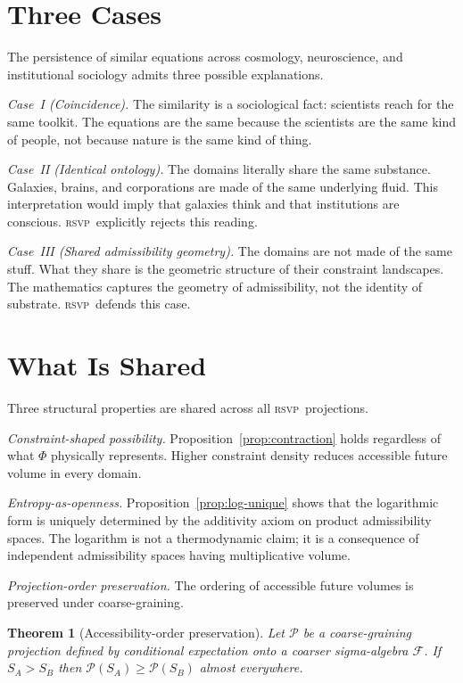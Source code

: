 \documentclass[12pt, oneside]{book}
\theoremstyle{plain}
\newtheorem{theorem}{Theorem}[chapter]
\theoremstyle{definition}
\newcommand{\RSVP}{\textsc{rsvp}}
\begin{document}
\section{Three Cases}
\label{sec:three-cases}

The persistence of similar equations across cosmology, neuroscience, and institutional
sociology admits three possible explanations.

\textit{Case~I (Coincidence).} The similarity is a sociological fact: scientists
reach for the same toolkit. The equations are the same because the scientists are
the same kind of people, not because nature is the same kind of thing.

\textit{Case~II (Identical ontology).} The domains literally share the same substance.
Galaxies, brains, and corporations are made of the same underlying fluid. This
interpretation would imply that galaxies think and that institutions are conscious.
\RSVP\ explicitly rejects this reading.

\textit{Case~III (Shared admissibility geometry).} The domains are not made of the
same stuff. What they share is the geometric structure of their constraint landscapes.
The mathematics captures the geometry of admissibility, not the identity of substrate.
\RSVP\ defends this case.

\section{What Is Shared}
\label{sec:shared}

Three structural properties are shared across all \RSVP\ projections.

\textit{Constraint-shaped possibility.} Proposition~\ref{prop:contraction} holds
regardless of what $\Phi$ physically represents. Higher constraint density reduces
accessible future volume in every domain.

\textit{Entropy-as-openness.} Proposition~\ref{prop:log-unique} shows that the
logarithmic form is uniquely determined by the additivity axiom on product
admissibility spaces. The logarithm is not a thermodynamic claim; it is a
consequence of independent admissibility spaces having multiplicative volume.

\textit{Projection-order preservation.} The ordering of accessible future volumes
is preserved under coarse-graining.

\begin{theorem}[Accessibility-order preservation]
\label{thm:order}
Let $\mathcal{P}$ be a coarse-graining projection defined by conditional expectation
onto a coarser sigma-algebra $\mathcal{F}$. If $S_A > S_B$ then
$\mathcal{P}(S_A) \geq \mathcal{P}(S_B)$ almost everywhere.
\end{theorem}
\end{document}

